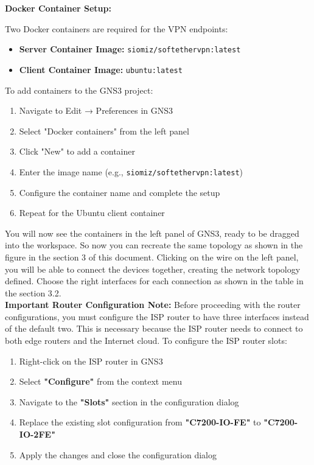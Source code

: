 \noindent
\textbf{Docker Container Setup:}

\noindent
Two Docker containers are required for the VPN endpoints:

\begin{itemize}
    \item \textbf{Server Container Image:} \texttt{siomiz/softethervpn:latest}
    \item \textbf{Client Container Image:} \texttt{ubuntu:latest}
\end{itemize}

\noindent
To add containers to the GNS3 project:

\begin{enumerate}
    \item Navigate to Edit → Preferences in GNS3
    \item Select "Docker containers" from the left panel
    \item Click "New" to add a container
    \item Enter the image name (e.g., \texttt{siomiz/softethervpn:latest})
    \item Configure the container name and complete the setup
    \item Repeat for the Ubuntu client container
\end{enumerate}

\noindent
You will now see the containers in the left panel of GNS3, ready to be dragged into the workspace. So now you can recreate the same topology as shown in the figure in the section 3 of this document. Clicking on the wire on the left panel, you will be able to connect the devices together, creating the network topology defined. Choose the right interfaces for each connection as shown in the table in the section 3.2.\\

\noindent
\textbf{Important Router Configuration Note:}
\noindent
Before proceeding with the router configurations, you must configure the ISP router to have three interfaces instead of the default two. This is necessary because the ISP router needs to connect to both edge routers and the Internet cloud. To configure the ISP router slots:

\begin{enumerate}
    \item Right-click on the ISP router in GNS3
    \item Select \textbf{"Configure"} from the context menu
    \item Navigate to the \textbf{"Slots"} section in the configuration dialog
    \item Replace the existing slot configuration from \textbf{"C7200-IO-FE"} to \textbf{"C7200-IO-2FE"}
    \item Apply the changes and close the configuration dialog
\end{enumerate}

